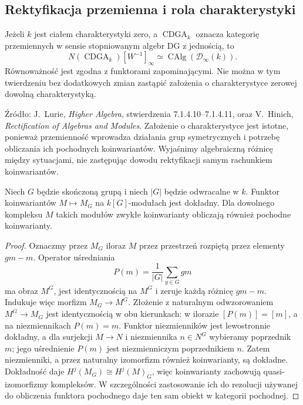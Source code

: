 \subsection{Rektyfikacja przemienna i rola charakterystyki}

\begin{twierdzenie}\label{cat:thm:infty-commutative-rectification}
Jeżeli $k$ jest ciałem charakterystyki zero, a $\operatorname{CDGA}_k$ oznacza kategorię przemiennych w sensie stopniowanym algebr DG z jednością, to
\[
 N(\operatorname{CDGA}_k)[W^{-1}]_\infty
 \simeq \operatorname{CAlg}(\mathcal D_\infty(k)).
\]
Równoważność jest zgodna z funktorami zapominającymi. Nie można w tym twierdzeniu bez dodatkowych zmian zastąpić założenia o charakterystyce zerowej dowolną charakterystyką.
\end{twierdzenie}

Źródło: J.~Lurie, \emph{Higher Algebra}, stwierdzenia 7.1.4.10--7.1.4.11, oraz V.~Hinich, \emph{Rectification of Algebras and Modules}. Założenie o charakterystyce jest istotne, ponieważ przemienność wprowadza działania grup symetrycznych i potrzebę obliczania ich pochodnych koinwariantów. Wyjaśnimy algebraiczną różnicę między sytuacjami, nie zastępując dowodu rektyfikacji samym rachunkiem koinwariantów.

\begin{lemat}\label{cat:lem:infty-coinvariants-maschke}
Niech $G$ będzie skończoną grupą i niech $|G|$ będzie odwracalne w $k$. Funktor koinwariantów $M\mapsto M_G$ na $k[G]$-modułach jest dokładny. Dla dowolnego kompleksu $M$ takich modułów zwykłe koinwarianty obliczają również pochodne koinwarianty.
\end{lemat}
\begin{proof}
Oznaczmy przez $M_G$ iloraz $M$ przez przestrzeń rozpiętą przez elementy $gm-m$. Operator uśredniania
\[
 P(m)=\frac{1}{|G|}\sum_{g\in G} gm
\]
ma obraz $M^G$, jest identycznością na $M^G$ i zeruje każdą różnicę $gm-m$. Indukuje więc morfizm $M_G\to M^G$. Złożenie z naturalnym odwzorowaniem $M^G\to M_G$ jest identycznością w obu kierunkach: w ilorazie $[P(m)]=[m]$, a na niezmiennikach $P(m)=m$. Funktor niezmienników jest lewostronnie dokładny, a dla surjekcji $M\to N$ i niezmiennika $n\in N^G$ wybieramy poprzednik $m$; jego uśrednienie $P(m)$ jest niezmienniczym poprzednikiem $n$. Zatem niezmienniki, a przez naturalny izomorfizm również koinwarianty, są dokładne. Dokładność daje $H^j(M_G)\cong H^j(M)_G$, więc koinwarianty zachowują quasi-izomorfizmy kompleksów. W szczególności zastosowanie ich do rezolucji używanej do obliczenia funktora pochodnego daje ten sam obiekt w kategorii pochodnej.
\end{proof}

